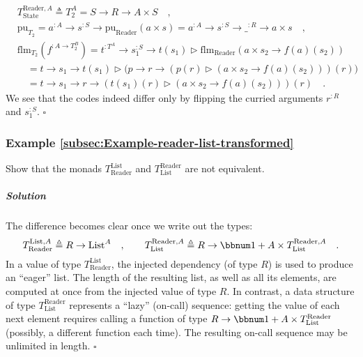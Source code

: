 \begin{align*}
 & T_{\text{State}}^{\text{Reader},A}\triangleq T_{2}^{A}=S\rightarrow R\rightarrow A\times S\quad,\\
 & \text{pu}_{T_{2}}=a^{:A}\rightarrow s^{:S}\rightarrow\text{pu}_{\text{Reader}}(a\times s)=a^{:A}\rightarrow s^{:S}\rightarrow\_^{:R}\rightarrow a\times s\quad,\\
 & \text{flm}_{T_{2}}(f^{:A\rightarrow T_{2}^{B}})=t^{:T^{A}}\rightarrow s_{1}^{:S}\rightarrow t(s_{1})\triangleright\text{flm}_{\text{Reader}}(a\times s_{2}\rightarrow f(a)(s_{2}))\\
 & \quad=t\rightarrow s_{1}\rightarrow t(s_{1})\triangleright\big(p\rightarrow r\rightarrow(p(r)\triangleright(a\times s_{2}\rightarrow f(a)(s_{2})))(r)\big)\\
 & \quad=t\rightarrow s_{1}\rightarrow r\rightarrow(t(s_{1})(r)\triangleright(a\times s_{2}\rightarrow f(a)(s_{2})))(r)\quad.
\end{align*}
We see that the codes indeed differ only by flipping the curried arguments
$r^{:R}$ and $s_{1}^{:S}$. $\square$

\subsubsection{Example \label{subsec:Example-reader-list-transformed}\ref{subsec:Example-reader-list-transformed}}

Show that the monads $T_{\text{Reader}}^{\text{List}}$ and $T_{\text{List}}^{\text{Reader}}$
are not equivalent.

\subparagraph{Solution}

The difference becomes clear once we write out the types:
\[
T_{\text{Reader}}^{\text{List},A}\triangleq R\rightarrow\text{List}^{A}\quad,\quad\quad T_{\text{List}}^{\text{Reader},A}\triangleq R\rightarrow\bbnum 1+A\times T_{\text{List}}^{\text{Reader},A}\quad.
\]
In a value of type $T_{\text{Reader}}^{\text{List}}$, the injected
dependency (of type $R$) is used to produce an \textsf{``}eager\textsf{''} list.
The length of the resulting list, as well as all its elements, are
computed at once from the injected value of type $R$. In contrast,
a data structure of type $T_{\text{List}}^{\text{Reader}}$ represents
a \textsf{``}lazy\textsf{''} (on-call) sequence: getting the value of each next element
requires calling a function of type $R\rightarrow\bbnum 1+A\times T_{\text{List}}^{\text{Reader}}$
(possibly, a different function each time). The resulting on-call
sequence may be unlimited in length. $\square$


